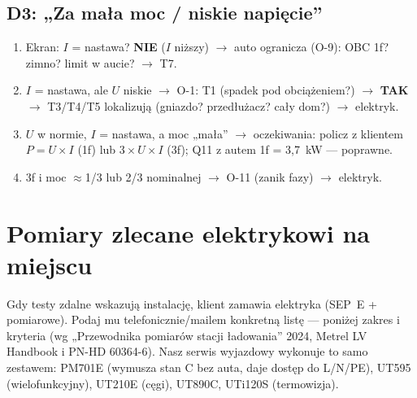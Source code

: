 \documentclass[11pt]{article}
\newcommand{\key}[1]{\textbf{\color{navy}#1}}
\begin{document}
\subsection{D3: „Za mała moc / niskie napięcie''}
\begin{enumerate}
\item Ekran: $I$ = nastawa? \key{NIE} ($I$ niższy) $\rightarrow$ auto ogranicza (O-9): OBC 1f? zimno? limit w aucie? $\rightarrow$ T7.
\item $I$ = nastawa, ale $U$ niskie $\rightarrow$ O-1: T1 (spadek pod obciążeniem?) $\rightarrow$ \key{TAK} $\rightarrow$ T3/T4/T5 lokalizują (gniazdo? przedłużacz? cały dom?) $\rightarrow$ elektryk.
\item $U$ w normie, $I$ = nastawa, a moc „mała'' $\rightarrow$ oczekiwania: policz z klientem $P=U\times I$ (1f) lub $3\times U \times I$ (3f); Q11 z autem 1f = 3,7~kW — poprawne.
\item 3f i moc $\approx$1/3 lub 2/3 nominalnej $\rightarrow$ O-11 (zanik fazy) $\rightarrow$ elektryk.
\end{enumerate}

\section{Pomiary zlecane elektrykowi na miejscu}\label{sec:pomiary}
Gdy testy zdalne wskazują instalację, klient zamawia elektryka (SEP~E + pomiarowe). Podaj mu telefonicznie/mailem konkretną listę — poniżej zakres i kryteria (wg „Przewodnika pomiarów stacji ładowania'' 2024, Metrel LV Handbook i PN-HD 60364-6). Nasz serwis wyjazdowy wykonuje to samo zestawem: PM701E (wymusza stan C bez auta, daje dostęp do L/N/PE), UT595 (wielofunkcyjny), UT210E (cęgi), UT890C, UTi120S (termowizja).
\end{document}
